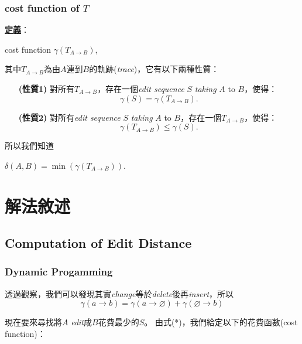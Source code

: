 \documentclass[15pt]{extarticle}
\begin{document}
\subsubsection{cost function of $T$}

\textbf{\uline{定義}}：

\begin{center}
cost function $\gamma(T_{A\to B})$,
\end{center}

其中$T_{A\to B}$為由$A$連到$B$的軌跡(\textit{trace})，它有以下兩種性質：
\begin{enumerate}
    \setlength\itemindent{1cm}
    \item [\textbf{(性質1)}] 對所有$T_{A\to B}$，存在一個\textit{edit sequence} $S$ \textit{taking} $A$ to $B$，使得：
    $$\gamma(S)=\gamma(T_{A\to B}).$$
    
    \item [\textbf{(性質2)}] 對所有\textit{edit sequence} $S$ \textit{taking} $A$ to $B$，存在一個$T_{A\to B}$，使得：
    $$\gamma(T_{A\to B})\le\gamma(S).$$
\end{enumerate}

所以我們知道 

\begin{center}
$\delta(A,B)=\min(\gamma(T_{A\to B}))$.
\end{center} 

\newpage
\section{解法敘述}
\subsection{Computation of Edit Distance}
\subsubsection{Dynamic Progamming}


透過觀察，我們可以發現其實\textit{change}等於\textit{delete}後再\textit{insert}，所以
\[\gamma(a\to b)=\gamma(a\to\varnothing)+\gamma(\varnothing\to b)\tag{*}
\]

現在要來尋找將$A$ \textit{edit}成$B$花費最少的$S$。
由式(*)，我們給定以下的花費函數(cost function)：
\end{document}
